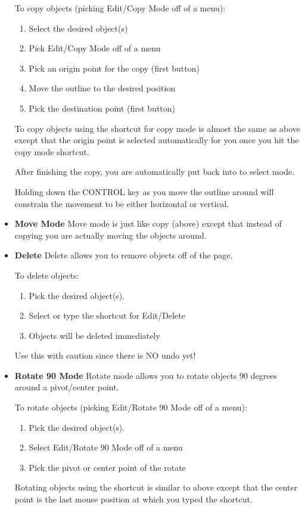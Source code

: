 \documentclass{article}
\begin{document}
\begin{itemize}
  To copy objects (picking Edit/Copy Mode off of a menu):
\begin{enumerate}
\item Select the desired object(s)
\item Pick Edit/Copy Mode off of a menu
\item Pick an origin point for the copy (first button)
\item Move the outline to the desired position
\item Pick the destination point (first button)
\end{enumerate}

To copy objects using the shortcut for copy mode is almost the same as
above except that the origin point is selected automatically for you
once you hit the copy mode shortcut.

After finishing the copy, you are automatically put back into to
select mode.

Holding down the CONTROL key as you move the outline around will
constrain the movement to be either horizontal or vertical.

\item {\bf Move Mode} Move mode is just like copy (above) except that
  instead of copying you are actually moving the objects around.
  
\item {\bf Delete} Delete allows you to remove objects off of the
  page.
  
  To delete objects:
  \begin{enumerate}
  \item Pick the desired object(s).
  \item Select or type the shortcut for Edit/Delete
  \item Objects will be deleted immediately  
  \end{enumerate}
  Use this with caution since there is NO undo yet!       
  
\item {\bf Rotate 90 Mode} Rotate mode allows you to rotate objects 90
  degrees around a pivot/center point.
  
  To rotate objects (picking Edit/Rotate 90 Mode off of a menu):
\begin{enumerate}
\item Pick the desired object(s).
\item Select Edit/Rotate 90 Mode off of a menu
\item Pick the pivot or center point of the rotate
\end{enumerate}
Rotating objects using the shortcut is similar to above except that
the center point is the last mouse position at which you typed the
shortcut.
                

\end{itemize}
\end{document}
